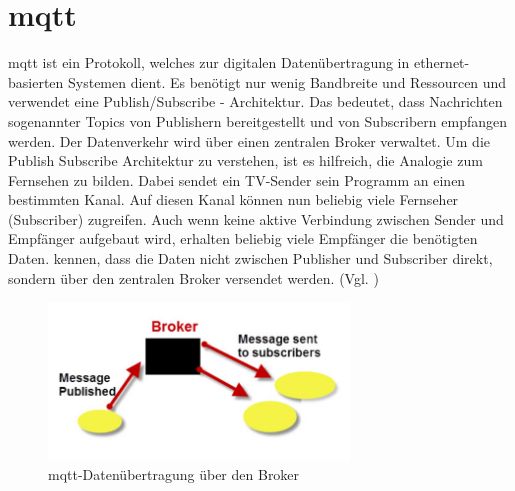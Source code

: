 \newpage
\section{\acrshort{mqtt}} 
\label{sec:mqtt}
\acrshort{mqtt} ist ein Protokoll, welches zur digitalen Datenübertragung in ethernet-basierten Systemen dient. Es benötigt nur wenig Bandbreite und Ressourcen und verwendet eine 
Publish/Subscribe - Architektur. Das bedeutet, dass Nachrichten sogenannter Topics von Publishern bereitgestellt und von Subscribern empfangen werden. Der Datenverkehr wird über einen 
zentralen Broker verwaltet. Um die Publish Subscribe Architektur zu verstehen, ist es hilfreich, die Analogie zum Fernsehen zu bilden. Dabei sendet ein TV-Sender sein Programm an einen bestimmten Kanal.
Auf diesen Kanal können nun beliebig viele Fernseher (Subscriber) zugreifen. Auch wenn keine aktive Verbindung zwischen Sender und Empfänger aufgebaut wird, erhalten beliebig viele Empfänger die benötigten Daten.
kennen, dass die Daten nicht zwischen Publisher und Subscriber direkt, sondern über den zentralen Broker versendet werden. (Vgl. \cite{mqtt})

\begin{figure}[h]
    \begin{center}
        \includegraphics[width=8cm]{mqttbroker.png}
        \caption{\acrshort{mqtt}-Datenübertragung über den Broker}
        \label{pic:mqttbroker}
    \end{center}
\end{figure}